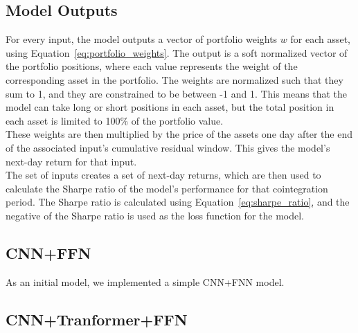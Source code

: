 \documentclass[12pt]{article}
\begin{document}
\vspace{20pt}

\subsection*{Model Outputs}

For every input, the model outputs a vector of portfolio weights $w$ for each asset, using Equation~\ref{eq:portfolio_weights}. The output is a soft normalized vector of the portfolio positions, where each value represents the weight of the corresponding asset in the portfolio. The weights are normalized such that they sum to 1, and they are constrained to be between -1 and 1. This means that the model can take long or short positions in each asset, but the total position in each asset is limited to 100\% of the portfolio value. 
\\

These weights are then multiplied by the price of the assets one day after the end of the associated input's cumulative residual window. This gives the model's next-day return for that input.
\\

The set of inputs creates a set of next-day returns, which are then used to calculate the Sharpe ratio of the model's performance for that cointegration period. The Sharpe ratio is calculated using Equation~\ref{eq:sharpe_ratio}, and the negative of the Sharpe ratio is used as the loss function for the model.


\subsection{CNN+FFN}
As an initial model, we implemented a simple CNN+FNN model. 

\subsection{CNN+Tranformer+FFN}

 \clearpage



\clearpage



\end{document}
